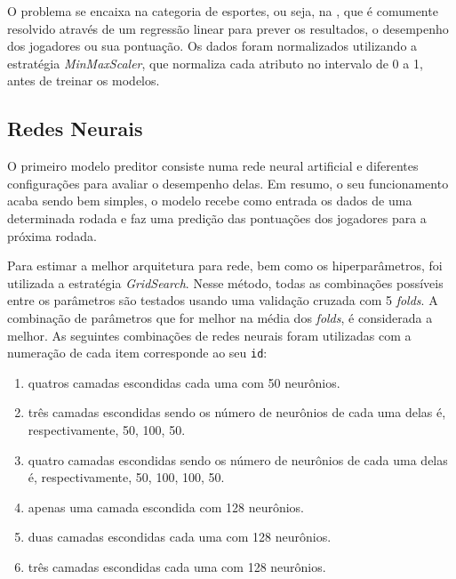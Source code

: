 \documentclass[conference]{IEEEtran}
\newcommand{\ttt}[1]{{\texttt{#1}}}
\newcommand{\tit}[1]{{\textit{#1}}}
\begin{document}
O problema se encaixa  na categoria de esportes, ou seja,  na , que é
comumente resolvido  através de um  regressão linear para  prever os
resultados, o  desempenho dos jogadores  ou sua pontuação.  Os dados
foram  normalizados utilizando  a estratégia  \tit{MinMaxScaler}, que
normaliza cada  atributo no intervalo  de 0 a  1, antes de  treinar os
modelos.

\subsection{Redes Neurais}

O  primeiro modelo  preditor consiste  numa rede  neural artificial  e
diferentes configurações para avaliar o desempenho delas. Em resumo,
o  seu funcionamento  acaba sendo  bem simples,  o modelo  recebe como
entrada os  dados de uma determinada  rodada e faz uma  predição das
pontuações dos jogadores para a próxima rodada.

Para   estimar  a   melhor  arquitetura   para  rede,   bem  como   os
hiperparâmetros,  foi  utilizada a  estratégia  \textit{GridSearch}.
Nesse método, todas as  combinações possíveis entre os parâmetros
são  testados usando  uma validação  cruzada com  5 \tit{folds}.  A
combinação de parâmetros que for  melhor na média dos \tit{folds},
é considerada a  melhor. As seguintes combinações  de redes neurais
foram utilizadas  com a  numeração de cada  item corresponde  ao seu
\ttt{id}:

\begin{enumerate}

\item quatros camadas escondidas cada uma com 50 neurônios.

\item três camadas escondidas sendo  os número de neurônios de cada
uma delas é, respectivamente, 50, 100, 50.

\item quatro camadas escondidas sendo os número de neurônios de cada
uma delas é, respectivamente, 50, 100, 100, 50.

\item apenas uma camada escondida com 128 neurônios.

\item duas camadas escondidas cada uma com 128 neurônios.

\item três camadas escondidas cada uma com 128 neurônios.

\end{enumerate}
\end{document}
